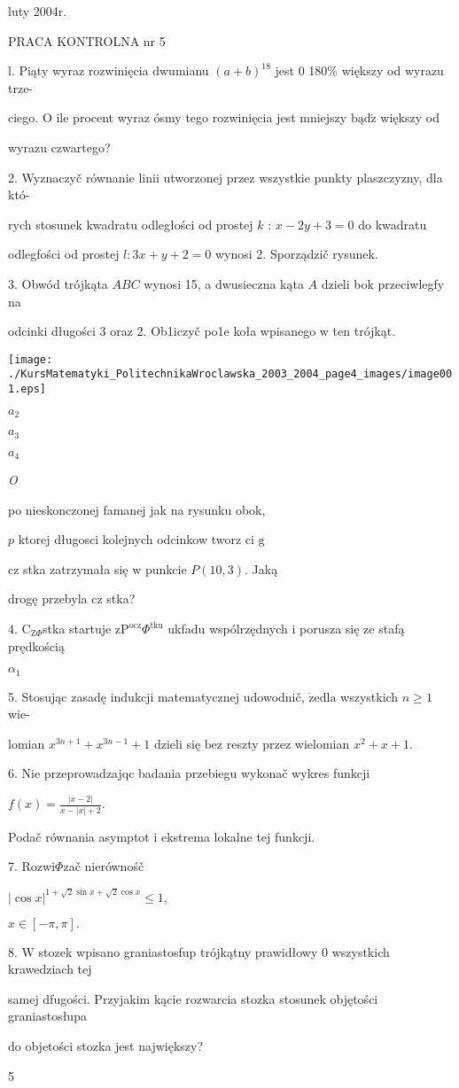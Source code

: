 \documentclass[a4paper,12pt]{article}
\begin{document}
luty 2004r.

PRACA KONTROLNA nr 5

l. Piąty wyraz rozwinięcia dwumianu $(a+b)^{18}$ jest $0$ 180\% większy od wyrazu trze-

ciego. $\mathrm{O}$ ile procent wyraz ósmy tego rozwinięcia jest mniejszy $\mathrm{b}\text{ą} \mathrm{d}\acute{\mathrm{z}}$ większy od

wyrazu czwartego?

2. Wyznaczyč równanie linii utworzonej przez wszystkie punkty plaszczyzny, dla któ-

rych stosunek kwadratu odległości od prostej $k$ : $x-2y+3 = 0$ do kwadratu

odlegfości od prostej $l:3x+y+2=0$ wynosi 2. Sporządzič rysunek.

3. Obwód trójkąta $ABC$ wynosi 15, a dwusieczna kąta $A$ dzieli bok przeciwlegfy na

odcinki długości 3 oraz 2. Ob1iczyč po1e koła wpisanego $\mathrm{w}$ ten trójkąt.
\begin{center}
\texttt{[image: ./KursMatematyki\_PolitechnikaWroclawska\_2003\_2004\_page4\_images/image001.eps]}
\end{center}
$a_{2}$

$a_{3}$

$a_{4}$

{\it O}

po nieskonczonej famanej jak na rysunku obok,

$p$ ktorej długosci kolejnych odcinkow tworz ci $\mathrm{g}$

cz stka zatrzymała się $\mathrm{w}$ punkcie $P(10,3)$. Jaką

drogę przebyla cz stka?

4. $\mathrm{C}_{\mathrm{Z}\Phi}$stka startuje $\mathrm{z}\mathrm{P}^{\mathrm{o}\mathrm{c}\mathrm{z}}\Phi^{\mathrm{t}\mathrm{k}\mathrm{u}}$ ukfadu wspólrzędnych $\mathrm{i}$ porusza się ze stafą prędkością

$\alpha_{1}$

5. Stosując zasadę indukcji matematycznej udowodnič, $\dot{\mathrm{z}}\mathrm{e}\mathrm{d}\mathrm{l}\mathrm{a}$ wszystkich $n\geq 1$ wie-

lomian $x^{3n+1}+x^{3n-1}+1$ dzieli się $\mathrm{b}\mathrm{e}\mathrm{z}$ reszty przez wielomian $x^{2}+x+1.$

6. Nie przeprowadzajqc badania przebiegu wykonač wykres funkcji

$f(x)=\displaystyle \frac{|x-2|}{x-|x|+2}.$

Podač równania asymptot i ekstrema lokalne tej funkcji.

7. Rozwi$\Phi$zač nierównośč

$|\cos x|^{1+\sqrt{2}\sin x+\sqrt{2}\cos x}\leq 1,$

$x\in[-\pi,\pi].$

8. W stozek wpisano graniastosfup trójkątny prawidłowy 0 wszystkich krawedziach tej

samej dfugości. Przyjakim kącie rozwarcia stozka stosunek objętości graniastosłupa

do objetości stozka jest największy?

5
\end{document}
